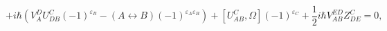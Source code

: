 \begin{equation}\label{22}
+i\hbar(V^D_AU^C_{DB}(-1)^{\varepsilon_B}
-(A\leftrightarrow B)(-1)^{\varepsilon_A\varepsilon_B})+
[U^C_{AB},\Omega](-1)^{\varepsilon_C}+\frac{1}{2}i\hbar
V^{ED}_{AB}Z^C_{DE}=0,
\end{equation}

